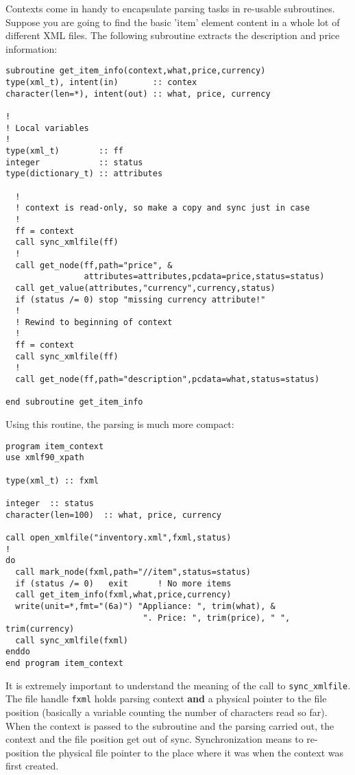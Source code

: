 \documentclass[11pt]{article}
\begin{document}
Contexts come in handy to encapsulate parsing tasks in re-usable
subroutines. Suppose you are going to find the basic 'item' element
content in a whole lot of different XML files. The following
subroutine extracts the description and price information:
%
\begin{verbatim}
subroutine get_item_info(context,what,price,currency)
type(xml_t), intent(in)       :: contex
character(len=*), intent(out) :: what, price, currency

!
! Local variables
!
type(xml_t)        :: ff
integer            :: status
type(dictionary_t) :: attributes

  ! 
  ! context is read-only, so make a copy and sync just in case
  !
  ff = context
  call sync_xmlfile(ff)  
  !
  call get_node(ff,path="price", &
                attributes=attributes,pcdata=price,status=status)
  call get_value(attributes,"currency",currency,status)
  if (status /= 0) stop "missing currency attribute!"
  !
  ! Rewind to beginning of context
  !
  ff = context
  call sync_xmlfile(ff)  
  !
  call get_node(ff,path="description",pcdata=what,status=status)

end subroutine get_item_info
\end{verbatim}
%
Using this routine, the parsing is much more compact:
%
\begin{verbatim}
program item_context
use xmlf90_xpath

type(xml_t) :: fxml

integer  :: status
character(len=100)  :: what, price, currency

call open_xmlfile("inventory.xml",fxml,status)
!
do
  call mark_node(fxml,path="//item",status=status)
  if (status /= 0)   exit      ! No more items
  call get_item_info(fxml,what,price,currency)
  write(unit=*,fmt="(6a)") "Appliance: ", trim(what), &
                            ". Price: ", trim(price), " ", trim(currency)
  call sync_xmlfile(fxml)
enddo
end program item_context
\end{verbatim}
%
It is extremely important to understand the meaning of the call to
\texttt{sync\_xmlfile}. The file handle \texttt{fxml} holds parsing
context \textbf{and} a physical pointer to the file position
(basically a variable counting the number of characters read so
far). When the context is passed to the subroutine and the parsing
carried out, the context and the file position get out of
sync. Synchronization means to re-position the physical file pointer
to the place where it was when the context was first created.
\end{document}
